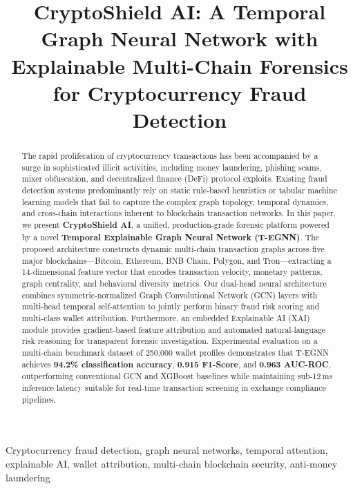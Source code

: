 \documentclass[conference]{IEEEtran}
\begin{document}
\title{CryptoShield AI: A Temporal Graph Neural Network with Explainable Multi-Chain Forensics for Cryptocurrency Fraud Detection}

\author{
}

\maketitle

\begin{abstract}
The rapid proliferation of cryptocurrency transactions has been accompanied by a surge in sophisticated illicit activities, including money laundering, phishing scams, mixer obfuscation, and decentralized finance (DeFi) protocol exploits. Existing fraud detection systems predominantly rely on static rule-based heuristics or tabular machine learning models that fail to capture the complex graph topology, temporal dynamics, and cross-chain interactions inherent to blockchain transaction networks. In this paper, we present \textbf{CryptoShield AI}, a unified, production-grade forensic platform powered by a novel \textbf{Temporal Explainable Graph Neural Network (T-EGNN)}. The proposed architecture constructs dynamic multi-chain transaction graphs across five major blockchains---Bitcoin, Ethereum, BNB Chain, Polygon, and Tron---extracting a 14-dimensional feature vector that encodes transaction velocity, monetary patterns, graph centrality, and behavioral diversity metrics. Our dual-head neural architecture combines symmetric-normalized Graph Convolutional Network (GCN) layers with multi-head temporal self-attention to jointly perform binary fraud risk scoring and multi-class wallet attribution. Furthermore, an embedded Explainable AI (XAI) module provides gradient-based feature attribution and automated natural-language risk reasoning for transparent forensic investigation. Experimental evaluation on a multi-chain benchmark dataset of 250,000 wallet profiles demonstrates that T-EGNN achieves \textbf{94.2\% classification accuracy}, \textbf{0.915 F1-Score}, and \textbf{0.963 AUC-ROC}, outperforming conventional GCN and XGBoost baselines while maintaining sub-12\,ms inference latency suitable for real-time transaction screening in exchange compliance pipelines.
\end{abstract}

\begin{IEEEkeywords}
Cryptocurrency fraud detection, graph neural networks, temporal attention, explainable AI, wallet attribution, multi-chain blockchain security, anti-money laundering
\end{IEEEkeywords}
\end{document}
